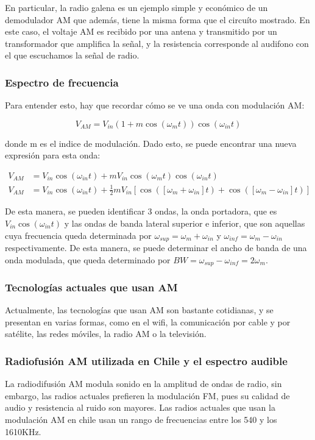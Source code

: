 En particular, la radio galena es un ejemplo simple y económico de un demodulador AM que además, tiene la misma forma que el circuíto mostrado. En este caso, el voltaje AM es recibido por una antena y transmitido por un transformador que amplifica la señal, y la resistencia corresponde al audifono con el que escuchamos la señal de radio.

\subsubsection{Espectro de frecuencia}

Para entender esto, hay que recordar cómo se ve una onda con modulación AM:

\begin{equation*}
    V_{AM}=V_{in}(1+m\cos(\omega_mt))\cos(\omega_{in}t)
\end{equation*}

donde m es el indice de modulación. Dado esto, se puede encontrar una nueva expresión para esta onda:

\begin{align*}
    V_{AM} & =V_{in}\cos(\omega_{in}t)+mV_{in}\cos(\omega_mt)\cos(\omega_{in}t)                                        \\
    V_{AM} & =V_{in}\cos(\omega_{in}t)+\frac{1}{2}mV_{in}[\cos([\omega_m+\omega_{in}]t)+\cos([\omega_m-\omega_{in}]t)]
\end{align*}

De esta manera, se pueden identificar 3 ondas, la onda portadora, que es $V_{in}\cos(\omega_{in}t)$ y las ondas de banda lateral superior e inferior, que son aquellas cuya frecuencia queda determinada por $\omega_{sup}=\omega_m+\omega_{in}$ y $\omega_{inf}=\omega_m - \omega_{in}$ respectivamente. De esta manera, se puede determinar el ancho de banda de una onda modulada, que queda determinado por $BW = \omega_{sup}-\omega_{inf} = 2\omega_m$.

\subsubsection{Tecnologías actuales que usan AM}

Actualmente, las tecnologías que usan AM son bastante cotidianas, y se presentan en varias formas, como en el wifi, la comunicación por cable y por satélite, las redes móviles, la radio AM o la televisión.

\subsubsection{Radiofusión AM utilizada en Chile y el espectro audible}

La radiodifusión AM modula sonido en la amplitud de ondas de radio, sin embargo, las radios actuales prefieren la modulación FM, pues su calidad de audio y resistencia al ruido son mayores. Las radios actuales que usan la modulación AM en chile usan un rango de frecuencias entre los 540 y los 1610KHz.